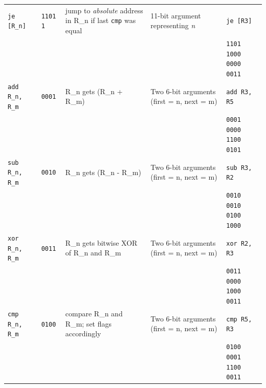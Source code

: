 \documentclass{report}
\begin{document}
\begin{table}[h]
\begin{tabularx}{\textwidth}{@{}l l X X X@{}}
		\texttt{je [R\_n]}
		                     & \texttt{1101 1}
		                     & jump to \emph{absolute} address in R\_n if last \texttt{cmp} was equal
		                     & 11-bit argument representing \emph{n}
		                     & \texttt{je [R3]}                                                                                                                                      \\
		                     &
		                     &
		                     &
		                     & \texttt{1101 1000 0000 0011}
		\\

		\texttt{add R\_n, R\_m}
		                     & \texttt{0001}
		                     & R\_n gets (R\_n + R\_m)
		                     & Two 6-bit arguments (first = n, next = m)
		                     & \texttt{add R3, R5}                                                                                                                                   \\
		                     &
		                     &
		                     &
		                     & \texttt{0001 0000 1100 0101}
		\\

		\texttt{sub R\_n, R\_m}
		                     & \texttt{0010}
		                     & R\_n gets (R\_n - R\_m)
		                     & Two 6-bit arguments (first = n, next = m)
		                     & \texttt{sub R3, R2}                                                                                                                                   \\
		                     &
		                     &
		                     &
		                     & \texttt{0010 0010 0100 1000}
		\\

		\texttt{xor R\_n, R\_m}
		                     & \texttt{0011}
		                     & R\_n gets bitwise XOR of R\_n and R\_m
		                     & Two 6-bit arguments (first = n, next = m)
		                     & \texttt{xor R2, R3}                                                                                                                                   \\
		                     &
		                     &
		                     &
		                     & \texttt{0011 0000 1000 0011}
		\\

		\texttt{cmp R\_n, R\_m}
		                     & \texttt{0100}
		                     & compare R\_n and R\_m; set flags accordingly
		                     & Two 6-bit arguments (first = n, next = m)
		                     & \texttt{cmp R5, R3}                                                                                                                                   \\
		                     &
		                     &
		                     &
		                     & \texttt{0100 0001 1100 0011}
		\\


\end{tabularx}
\end{table}
\end{document}
